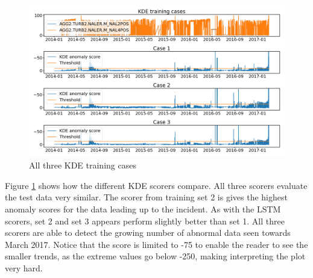         \begin{figure}[h!]
            \centering
            \includegraphics[width=\textwidth]{report/figures/analysis/training_cases/kde_training_cases.png}
            \caption{All three KDE training cases}
            \label{fig:kde_training_cases}
        \end{figure}
        Figure \ref{fig:kde_training_cases} shows how the different KDE scorers compare. All three scorers evaluate the test data very similar. The scorer from training set 2 is gives the highest anomaly scores for the data leading up to the incident. As with the LSTM scorers, set 2 and set 3 appears perform slightly better than set 1. All three scorers are able to detect the growing number of abnormal data seen towards March 2017. Notice that the score is limited to -75 to enable the reader to see the smaller trends, as the extreme values go below -250, making interpreting the plot very hard.
        
